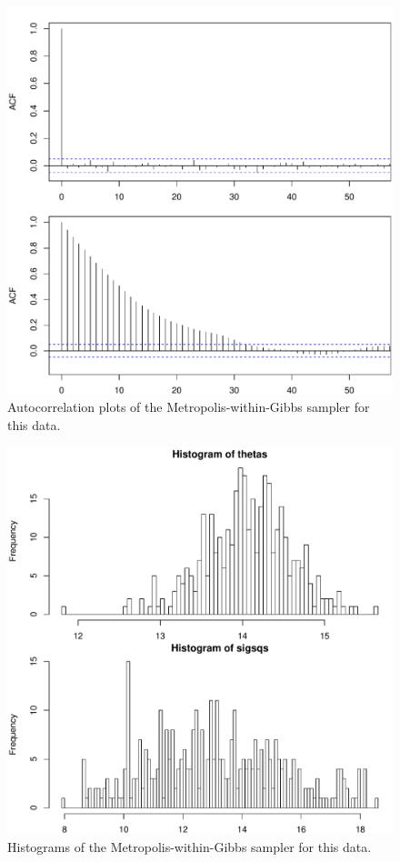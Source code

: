 \documentclass[12pt]{article}
\begin{document}
\begin{figure}[htp]
\centering
\includegraphics[width=7in]{ac}
\caption{Autocorrelation plots of the Metropolis-within-Gibbs sampler for this data.}
\label{fig:ac}
\end{figure}

\begin{figure}[htp]
\centering
\includegraphics[width=7in]{hist}
\caption{Histograms of the Metropolis-within-Gibbs sampler for this data.}
\label{fig:hist}
\end{figure}
\end{document}
